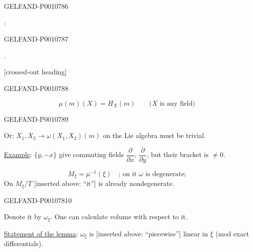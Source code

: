 \begin{GelfandAdjacentEvidence}{GELFAND-P001078}{6}


: 
\end{GelfandAdjacentEvidence}
\begin{GelfandAdjacentEvidence}{GELFAND-P001078}{7}

.

[crossed-out heading]
\end{GelfandAdjacentEvidence}
\begin{GelfandAdjacentEvidence}{GELFAND-P001078}{8}

\begin{equation*}
\mu(m)(X)=H_X(m)\qquad\text{($X$ is any field)}
\tag{1}
\end{equation*}
\end{GelfandAdjacentEvidence}
\begin{GelfandAdjacentEvidence}{GELFAND-P001078}{9}


Or:  $X_1,X_2\longrightarrow\omega(X_1,X_2)(m)$
on the Lie algebra must be trivial.

\uline{Example}: $\{y,-x\}$ give commuting fields
$\dfrac{\partial}{\partial x}$, $\dfrac{\partial}{\partial y}$,
but their bracket is $\ne0$.

\begin{equation*}
M_\xi=\mu^{-1}(\xi)\quad\text{; on it \(\omega\) is degenerate;}
\tag{2}
\end{equation*}
On $M_\xi/T$ [inserted above: “it”] is already nondegenerate.
\end{GelfandAdjacentEvidence}
\begin{GelfandAdjacentEvidence}{GELFAND-P001078}{10}

Denote it by $\omega_\xi$. One can calculate volume with respect to it.

\uline{Statement of the lemma}: $\omega_\xi$ is [inserted above: “piecewise”] linear in $\xi$ ($\mathrm{mod}$ exact differentials).
\end{GelfandAdjacentEvidence}
